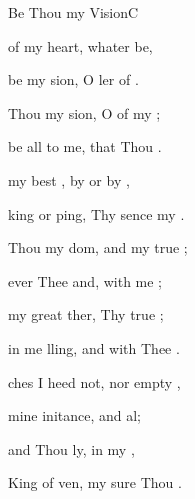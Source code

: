 \begin{song}{Be Thou my Vision}{C}
\begin{SBVerse}
     of my  heart, 
        whater be,

     be my sion, 
        O ler of .

    \Ch{[Interlude:}{}    \Ch{D]}{}
  \end{SBVerse}

  \begin{SBExtraKeys}{
  \CBPageBrk

  \begin{SBVerse}
     Thou my sion, 
        O  of my ;

     be all  to me, 
         that Thou .

     my best , 
        by  or by ,

    king or ping, 
        Thy sence my .

    \Ch{[Interlude:}{}    \Ch{G]}{}
  \end{SBVerse}

  \begin{SBVerse}
     Thou my dom, 
        and  my true ;

     ever  Thee and, 
         with me ;

     my great ther, 
         Thy true ;

     in me lling, 
        and  with Thee .

    \Ch{[Interlude:}{}    \Ch{G]}{}
  \end{SBVerse}


  \begin{SBVerse}
    ches I heed  not, 
        nor  empty ,

     mine initance, 
         and al;

     and Thou ly, 
         in my ,

     King of ven, 
        my sure Thou .


\end{SBVerse}}
\end{SBExtraKeys}
\end{song}
